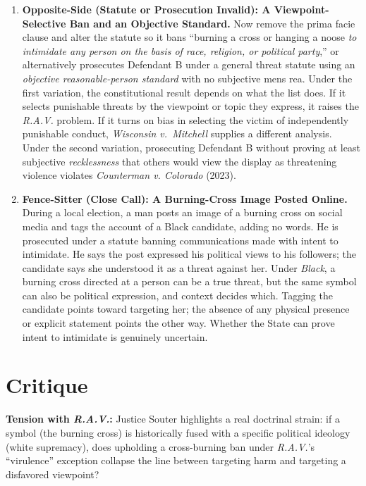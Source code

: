 \documentclass[12pt]{article}
\begin{document}
\begin{enumerate}
\item \textbf{Opposite-Side (Statute or Prosecution Invalid): A Viewpoint-Selective Ban and an Objective Standard.} Now remove the prima facie clause and alter the statute so it bans ``burning a cross or hanging a noose \textit{to intimidate any person on the basis of race, religion, or political party},'' or alternatively prosecutes Defendant B under a general threat statute using an \textit{objective reasonable-person standard} with no subjective mens rea. Under the first variation, the constitutional result depends on what the list does. If it selects punishable threats by the viewpoint or topic they express, it raises the \textit{R.A.V.} problem. If it turns on bias in selecting the victim of independently punishable conduct, \textit{Wisconsin v.\ Mitchell} supplies a different analysis. Under the second variation, prosecuting Defendant B without proving at least subjective \textit{recklessness} that others would view the display as threatening violence violates \textit{Counterman v. Colorado} (2023).

\item \textbf{Fence-Sitter (Close Call): A Burning-Cross Image Posted Online.} During a local election, a man posts an image of a burning cross on social media and tags the account of a Black candidate, adding no words. He is prosecuted under a statute banning communications made with intent to intimidate. He says the post expressed his political views to his followers; the candidate says she understood it as a threat against her. Under \textit{Black}, a burning cross directed at a person can be a true threat, but the same symbol can also be political expression, and context decides which. Tagging the candidate points toward targeting her; the absence of any physical presence or explicit statement points the other way. Whether the State can prove intent to intimidate is genuinely uncertain.

\end{enumerate}

\section{Critique}
\textbf{Tension with \textit{R.A.V.}:} Justice Souter highlights a real doctrinal strain: if a symbol (the burning cross) is historically fused with a specific political ideology (white supremacy), does upholding a cross-burning ban under \textit{R.A.V.}'s ``virulence'' exception collapse the line between targeting harm and targeting a disfavored viewpoint?
\end{document}
